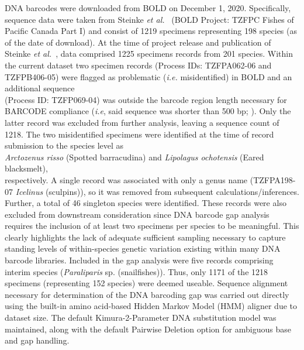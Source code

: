 DNA barcodes were downloaded from BOLD on December 1, 2020. Specifically, \\ sequence data were taken from Steinke \textit{et al.}~\cite{steinke2009dna} (BOLD Project: TZFPC Fishes of Pacific Canada Part I) and consist of 1219 specimens representing 198 species (as of the date of download). At the time of project release and publication of Steinke \textit{et al.}~\cite{steinke2009dna}, data comprised 1225 specimens records from 201 species. Within the current dataset two specimen records (Process IDs: TZFPA062-06 and TZFPB406-05) were flagged as problematic (\textit{i.e.} misidentified) in BOLD and an additional sequence \\ (Process ID: TZFP069-04) was outside the barcode region length necessary for BARCODE compliance (\textit{i.e}, said sequence was shorter than 500 bp; \cite{hanner2009data}). Only the latter record was excluded from further analysis, leaving a sequence count of 1218. The two misidentified specimens were identified at the time of record submission to the species level as \\ \textit{Arctozenus risso} (Spotted barracudina) and \textit{Lipolagus ochotensis} (Eared blacksmelt), \\ respectively. A single record was associated with only a genus name (TZFPA198-07 \textit{Icelinus} (sculpins)), so it was removed from subsequent calculations/inferences. Further, a total of 46 singleton species were identified. These records were also excluded from downstream consideration since DNA barcode gap analysis requires the inclusion of at least two specimens per species to be meaningful. This clearly highlights the lack of adequate sufficient sampling necessary to capture standing levels of within-species genetic variation existing within many DNA barcode libraries. Included in the gap analysis were five records comprising interim species (\textit{Paraliparis} sp. (snailfishes)). Thus, only 1171 of the 1218 specimens (representing 152 species) were deemed useable. Sequence alignment necessary for determination of the DNA barcoding gap was carried out directly using the built-in amino acid-based Hidden Markov Model (HMM) aligner due to dataset size. The default Kimura-2-Parameter DNA substitution model was maintained, along with the default Pairwise Deletion option for ambiguous base and gap handling. 



